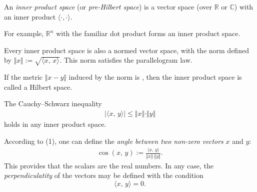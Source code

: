 \documentclass[12pt]{article}
\def\ip#1{{\langle #1\rangle}}
\begin{document}

An \emph{inner product space} (or \emph{pre-Hilbert space}) is a vector space
(over $\mathbb{R}$ or $\mathbb{C}$)
with an inner product $\ip{\cdot,\cdot}$.

For example, $\mathbb{R}^n$ with the familiar dot product
forms an inner product space.

Every inner product space is also a normed vector space,
with the norm defined by $\Vert x \Vert := \sqrt{\ip{x,\,x}}$.
This norm satisfies the parallelogram law.

If the metric $\Vert{x-y}\Vert$
induced by the norm is ,
then the inner product space is called a Hilbert space.

The Cauchy--Schwarz inequality 
\begin{align}
  |\ip{x,\,y}| \le \Vert x\Vert \cdot\Vert y\Vert
\end{align}
holds in any inner product space.

According to (1), one can define the {\em angle between two non-zero vectors} $x$ and $y$:
\begin{align}
  \cos(x,\,y) := \frac{\ip{x,\,y}}{\Vert{x}\Vert\cdot\Vert{y}\Vert}.
\end{align}
This provides that the scalars are the real numbers.  In any case, the {\em perpendiculatity} of the vectors may be defined with the condition
 $$\ip{x,\,y} =0.$$
\end{document}
